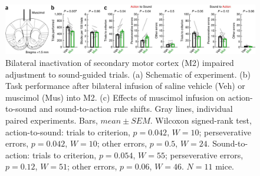 \begin{figure}[htbp]

\begin{center}
\includegraphics[width=\textwidth]{Figures/Chapter3/NN_fig2} 
\end{center}

\caption[Bilateral inactivation of M2 impaired adjustment to sound rule]
{Bilateral inactivation of secondary motor cortex (M2) impaired adjustment to sound-guided trials. (a) Schematic of experiment. (b) Task performance after bilateral infusion of saline vehicle (Veh) or muscimol (Mus) into M2. (c) Effects of muscimol infusion on action-to-sound and sound-to-action rule shifts. Gray lines, individual paired experiments. Bars, $\mathit{mean}\pm\mathit{SEM}$. Wilcoxon signed-rank test, action-to-sound: trials to criterion, $p = 0.042$, $W = 10$; perseverative errors, $p = 0.042$, $W = 10$; other errors, $p = 0.5$, $W = 24$. Sound-to-action: trials to criterion, $p = 0.054$, $W = 55$; perseverative errors, $p = 0.12$, $W = 51$; other errors, $p = 0.06$, $W = 46$. $N = 11$ mice.}

\label{fig:NN_fig2}
\end{figure}